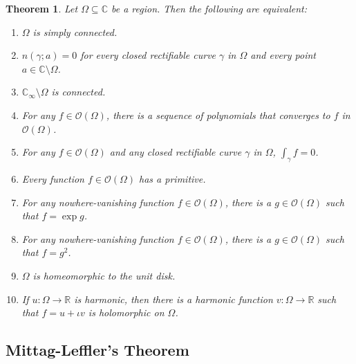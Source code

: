\documentclass[11pt]{article}
\theoremstyle{thmstyle}
\newtheorem{theorem}{Theorem}[section]
\theoremstyle{defstyle}
\newcommand{\R}{\mathbb{R}}
\newcommand{\bbC}{\mathbb{C}}
\newcommand{\scrO}{\mathscr{O}} %
\begin{document}
\begin{theorem}
    Let $\Omega\subseteq\bbC$ be a region. Then the following are equivalent: 
    \begin{enumerate}[label=(\arabic*)]
        \item $\Omega$ is simply connected. 
        \item $n(\gamma; a) = 0$ for every closed rectifiable curve $\gamma$ in $\Omega$ and every point $a\in\bbC\setminus\Omega$.
        \item $\bbC_\infty\setminus\Omega$ is connected. 
        \item For any $f\in\scrO(\Omega)$, there is a sequence of polynomials that converges to $f$ in $\scrO(\Omega)$. 
        \item For any $f\in\scrO(\Omega)$ and any closed rectifiable curve $\gamma$ in $\Omega$, $\int_\gamma f = 0$. 
        \item Every function $f\in\scrO(\Omega)$ has a primitive. 
        \item For any nowhere-vanishing function $f\in\scrO(\Omega)$, there is a $g\in\scrO(\Omega)$ such that $f = \exp g$. 
        \item For any nowhere-vanishing function $f\in\scrO(\Omega)$, there is a $g\in\scrO(\Omega)$ such that $f = g^2$. 
        \item $\Omega$ is homeomorphic to the unit disk. 
        \item If $u\colon\Omega\to\R$ is harmonic, then there is a harmonic function $v\colon\Omega\to\R$ such that $f = u + \iota v$ is holomorphic on $\Omega$.
    \end{enumerate}
\end{theorem}

\subsection{Mittag-Leffler's Theorem}
\end{document}
